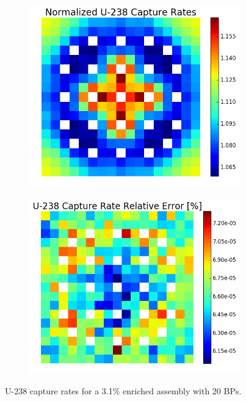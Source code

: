 \begin{figure}[h!]
\centering
\begin{subfigure}{0.44\textwidth}
  \centering
  \includegraphics[width=\linewidth]{figures/benchmarks/capture-rates/capt-mean-fuel-31-20BAs}
  \caption{}
  \label{fig:chap7-capt-rate-mean-3.1-20BAs-assm}
\end{subfigure}%
\begin{subfigure}{0.44\textwidth}
  \centering
  \includegraphics[width=\linewidth]{figures/benchmarks/capture-rates/capt-rel-err-fuel-31-20BAs}
  \caption{}
  \label{fig:chap7-capt-rate-rel-err-3.1-20BAs-assm}
\end{subfigure}%
\caption[U-238 capture rates for a 3.1\% enriched assembly with 20 BPs]{U-238 capture rates for a 3.1\% enriched assembly with 20 \ac{BP}s.}
\label{fig:chap7-capt-rates-3.1-assm-20BAs}
\end{figure}

